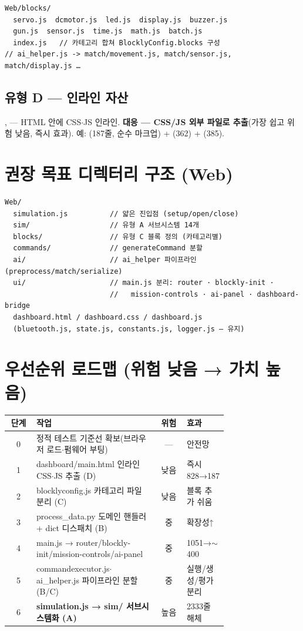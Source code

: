 \begin{verbatim}
Web/blocks/
  servo.js  dcmotor.js  led.js  display.js  buzzer.js
  gun.js  sensor.js  time.js  math.js  batch.js
  index.js   // 카테고리 합쳐 BlocklyConfig.blocks 구성
// ai_helper.js -> match/movement.js, match/sensor.js, match/display.js …
\end{verbatim}

\subsection{유형 D --- 인라인 자산}
,  --- HTML 안에 CSS$\cdot$JS 인라인.
\textbf{대응 --- CSS/JS 외부 파일로 추출}(가장 쉽고 위험 낮음, 즉시 효과). 예:
(187줄, 순수 마크업) + (362) + (385).

\section{권장 목표 디렉터리 구조 (Web)}
\begin{verbatim}
Web/
  simulation.js          // 얇은 진입점 (setup/open/close)
  sim/                   // 유형 A 서브시스템 14개
  blocks/                // 유형 C 블록 정의 (카테고리별)
  commands/              // generateCommand 분할
  ai/                    // ai_helper 파이프라인 (preprocess/match/serialize)
  ui/                    // main.js 분리: router · blockly-init ·
                         //   mission-controls · ai-panel · dashboard-bridge
  dashboard.html / dashboard.css / dashboard.js
  (bluetooth.js, state.js, constants.js, logger.js — 유지)
\end{verbatim}

\section{우선순위 로드맵 (위험 낮음 → 가치 높음)}
\begin{center}
\renewcommand{\arraystretch}{1.25}
\begin{tabularx}{\linewidth}{@{}c L{0.56\linewidth} c >{\footnotesize}L{0.18\linewidth}@{}}
\toprule
\sffamily 단계 & \sffamily 작업 & \sffamily 위험 & \sffamily 효과 \\
 & 정적 테스트 기준선 확보(브라우저 로드$\cdot$펌웨어 부팅) & --- & 안전망 \\
1 & dashboard/main.html 인라인 CSS$\cdot$JS 추출 (D) & 낮음 & 즉시 828→187 \\
2 & blocklyconfig.js 카테고리 파일 분리 (C) & 낮음 & 블록 추가 쉬움 \\
3 & process\_data.py 도메인 핸들러 + dict 디스패치 (B) & 중 & 확장성↑ \\
4 & main.js → router/blockly-init/mission-controls/ai-panel & 중 & 1051→$\sim$400 \\
5 & commandexecutor.js$\cdot$ai\_helper.js 파이프라인 분할 (B/C) & 중 & 실행/생성/평가 분리 \\
6 & \textbf{simulation.js → sim/ 서브시스템화 (A)} & 높음 & 2333줄 해체 \\
\bottomrule
\end{tabularx}
\end{center}

